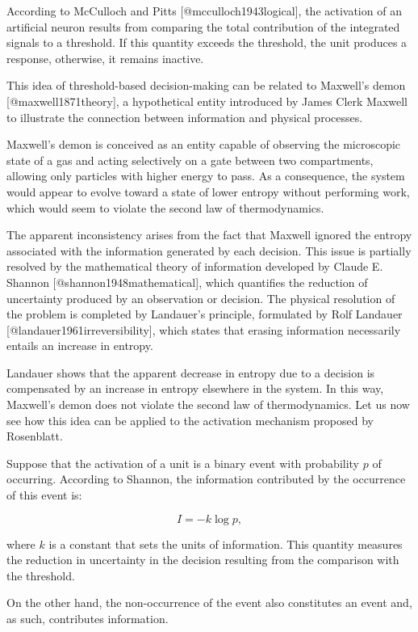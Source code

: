 \documentclass[12pt]{article}
\begin{document}
According to McCulloch and Pitts [@mcculloch1943logical], the activation of an artificial neuron results from comparing the total contribution of the integrated signals to a threshold. If this quantity exceeds the threshold, the unit produces a response, otherwise, it remains inactive.

This idea of threshold-based decision-making can be related to Maxwell’s demon [@maxwell1871theory], a hypothetical entity introduced by James Clerk Maxwell to illustrate the connection between information and physical processes.

Maxwell’s demon is conceived as an entity capable of observing the microscopic state of a gas and acting selectively on a gate between two compartments, allowing only particles with higher energy to pass. As a consequence, the system would appear to evolve toward a state of lower entropy without performing work, which would seem to violate the second law of thermodynamics.

The apparent inconsistency arises from the fact that Maxwell ignored the entropy associated with the information generated by each decision. This issue is partially resolved by the mathematical theory of information developed by Claude E. Shannon [@shannon1948mathematical], which quantifies the reduction of uncertainty produced by an observation or decision. The physical resolution of the problem is completed by Landauer’s principle, formulated by Rolf Landauer [@landauer1961irreversibility], which states that erasing information necessarily entails an increase in entropy.

Landauer shows that the apparent decrease in entropy due to a decision is compensated by an increase in entropy elsewhere in the system. In this way, Maxwell’s demon does not violate the second law of thermodynamics. Let us now see how this idea can be applied to the activation mechanism proposed by Rosenblatt.

Suppose that the activation of a unit is a binary event with probability $p$ of occurring. According to Shannon, the information contributed by the occurrence of this event is:

\begin{equation}
I = -k \log p,
\end{equation}

where $k$ is a constant that sets the units of information. This quantity measures the reduction in uncertainty in the decision resulting from the comparison with the threshold.

On the other hand, the non-occurrence of the event also constitutes an event and, as such, contributes information.
\end{document}
